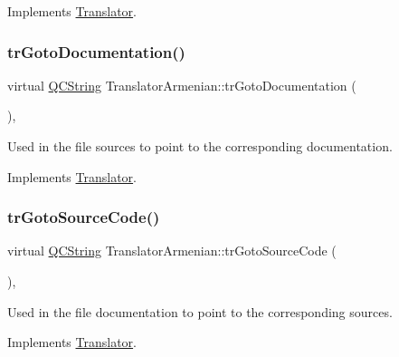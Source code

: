 Implements \mbox{\hyperlink{class_translator}{Translator}}.

\mbox{\label{class_translator_armenian_a8c22c6db1aac1a5e7ef715909a003abf}} 
\subsubsection{\texorpdfstring{trGotoDocumentation()}{trGotoDocumentation()}}
{\footnotesize\ttfamily virtual \mbox{\hyperlink{class_q_c_string}{Q\+C\+String}} Translator\+Armenian\+::tr\+Goto\+Documentation (\begin{DoxyParamCaption}{ }\end{DoxyParamCaption})\hspace{0.3cm}{\ttfamily [inline]}, {\ttfamily [virtual]}}

Used in the file sources to point to the corresponding documentation. 

Implements \mbox{\hyperlink{class_translator}{Translator}}.

\mbox{\label{class_translator_armenian_ad16df7f499325f9fbfbc8477283d427a}} 
\subsubsection{\texorpdfstring{trGotoSourceCode()}{trGotoSourceCode()}}
{\footnotesize\ttfamily virtual \mbox{\hyperlink{class_q_c_string}{Q\+C\+String}} Translator\+Armenian\+::tr\+Goto\+Source\+Code (\begin{DoxyParamCaption}{ }\end{DoxyParamCaption})\hspace{0.3cm}{\ttfamily [inline]}, {\ttfamily [virtual]}}

Used in the file documentation to point to the corresponding sources. 

Implements \mbox{\hyperlink{class_translator}{Translator}}.

\mbox{\label{class_translator_armenian_aba0df9ace96fe7e800001aeb1846cf1f}} 
